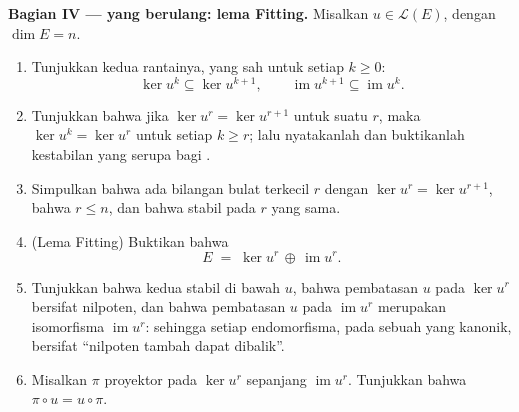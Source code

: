 \begin{problem}
\medskip
\noindent\textbf{Bagian IV ---  yang berulang: lema Fitting.}
Misalkan $u \in \mathcal{L}(E)$, dengan $\dim E = n$.
\begin{enumerate}[resume]
  \item Tunjukkan kedua rantainya, yang sah untuk setiap $k \geq 0$:
        \[
        \ker u^k \subseteq \ker u^{k+1},
        \qquad
        \operatorname{im} u^{k+1} \subseteq \operatorname{im}
        u^k .
        \]
  \item Tunjukkan bahwa jika $\ker u^{r} = \ker u^{r+1}$ untuk suatu $r$,
        maka $\ker u^{k} = \ker u^{r}$ untuk setiap $k \geq r$; lalu nyatakanlah
        dan buktikanlah kestabilan yang serupa bagi .
  \item Simpulkan bahwa ada bilangan bulat terkecil $r$ dengan $\ker
        u^{r} = \ker u^{r+1}$, bahwa $r \leq n$, dan bahwa 
        stabil pada $r$ yang sama.
  \item (Lema Fitting) Buktikan bahwa
        \[
        E \;=\; \ker u^{r} \,\oplus\, \operatorname{im} u^{r} .
        \]
  \item Tunjukkan bahwa kedua  stabil di bawah $u$, bahwa
        pembatasan $u$ pada $\ker u^{r}$ bersifat nilpoten, dan bahwa
        pembatasan $u$ pada $\operatorname{im} u^{r}$ merupakan
        isomorfisma $\operatorname{im} u^{r}$: sehingga setiap
        endomorfisma, pada sebuah  yang kanonik, bersifat ``nilpoten
        tambah dapat dibalik''.
  \item Misalkan $\pi$ proyektor pada $\ker u^{r}$ sepanjang
        $\operatorname{im} u^{r}$. Tunjukkan bahwa $\pi \circ u = u
        \circ \pi$.
\end{enumerate}


\end{problem}

